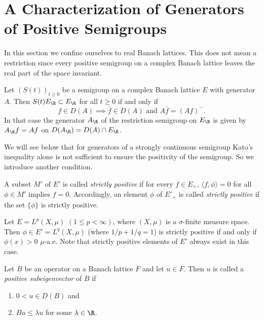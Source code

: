 \section{A Characterization of Generators of Positive Semigroups}\label{sec:c2-3}%
%
In this section we confine ourselves to real Banach lattices.
This does not mean a restriction since every positive semigroup on a complex Banach lattice leaves the real part of the space invariant.
\begin{remark}\label{rem:c2-3.1}
%
Let $(S(t))_{t \geq 0}$ be a semigroup on a complex Banach lattice $E$ with generator $A$.
Then $S(t)E_{\R} \subset E_{\R}$ for all $t \geq 0$ if and only if
\begin{equation}\label{eq:c2-3.1}
f \in D(A) \implies \bar{f} \in D(A) \text{ and } A\bar{f} = (Af)^{-}.
\end{equation}
In that case the generator $A_{\R}$ of the restriction semigroup on $E_{\R}$ is given by\\  $A_{\R}f = Af$ on $D(A_{\R}) = D(A) \cap E_{\R}$.
\end{remark}
We will see below that for generators of a strongly continuous semigroup Kato's inequality alone is not sufficient to ensure the positivity of the semigroup.
So we introduce another condition.
\begin{definition}\label{def:c2-3.2}
%
A subset $M'$ of\/ $E'$ is called \emph{strictly positive} if for every $f \in E_{+}$, $\langle f,\phi \rangle = 0$ for all $\phi \in M'$ implies $f = 0$.
Accordingly, an element $\phi$ of\/ $E'_{+}$ is called \emph{strictly positive} if the set $\{\phi\}$ is strictly positive.
\end{definition}
\begin{example}\label{ex:c2-3.3}
%
Let $E = L^p(X,\mu)$ $(1 \leq p < \infty)$, where $(X,\mu)$ is a $\sigma$-finite measure space.
Then $\phi \in E'
= L^q(X,\mu)$ (where $1/p + 1/q = 1$) is strictly positive if and only if\/ $\phi(x) > 0$ $\mu$-a.e.
Note that strictly positive elements of\/ $E'$ always exist in this case.
\end{example}
\begin{definition}\label{def:c2-3.4}
%
Let $B$ be an operator on a Banach lattice $F$ and let $u \in F$.
Then $u$ is called a \emph{positive subeigenvector} of\/ $B$ if
\begin{enumerate}[\upshape (i)]
\item \label{def:c2-3.4-1}
$0 < u \in D(B)$ and
\item \label{def:c2-3.4-2}
$Bu \leq \lambda u$ for some $\lambda \in \R$.
\end{enumerate}
\end{definition}
